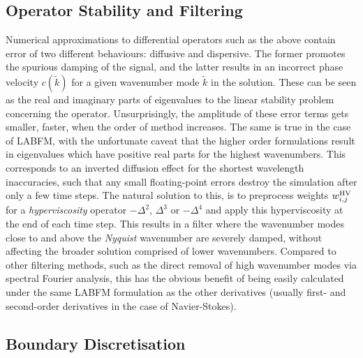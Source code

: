 \subsection{Operator Stability and Filtering}

Numerical approximations to differential operators such as the above contain error of two different behaviours: diffusive and dispersive. The former promotes the spurious damping of the signal, and the latter results in an incorrect phase velocity $c(\tilde{k})$ for a given wavenumber mode $\tilde{k}$ in the solution. These can be seen as the real and imaginary parts of eigenvalues to the linear stability problem concerning the operator. Unsurprisingly, the amplitude of these error terms gets smaller, faster, when the order of method increases. The same is true in the case of LABFM, with the unfortunate caveat that the higher order formulations result in eigenvalues which have positive real parts for the highest wavenumbers. This corresponds to an inverted diffusion effect for the shortest wavelength inaccuracies, such that any small floating-point errors destroy the simulation after only a few time steps. The natural solution to this, is to preprocess weights $w^{\rm{HV}}_{i, j}$ for a \emph{hyperviscosity} operator $-Δ^2$, $Δ^3$ or $-Δ^4$ and apply this hyperviscosity at the end of each time step. This results in a filter where the wavenumber modes close to and above the \emph{Nyquist} wavenumber \cite{nyquist1928CertainTopicsTelegraph} are severely damped, without affecting the broader solution comprised of lower wavenumbers. Compared to other filtering methods, such as the direct removal of high wavenumber modes via spectral Fourier analysis, this has the obvious benefit of being easily calculated under the same LABFM formulation as the other derivatives (usually first- and second-order derivatives in the case of Navier-Stokes).


\subsection{Boundary Discretisation}

